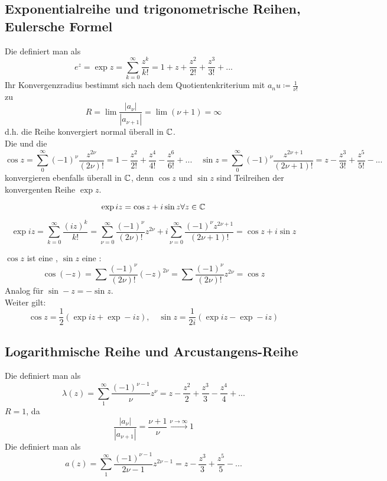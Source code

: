 \subsection*{Exponentialreihe und trigonometrische Reihen, Eulersche Formel} Die  definiert man als
\[ e^z=\exp z=\sum_{k=0}^{\infty}\frac{z^k}{k!}=1+z+\frac{z^2}{2!}+\frac{z^3}{3!}+... \]
Ihr Konvergenzradius bestimmt sich nach dem Quotientenkriterium mit $ a_nu\coloneqq\frac{1}{\nu!} $ zu
\[ R=\lim\frac{|a_\nu|}{|a_{\nu+1}|}=\lim (\nu+1)=\infty \]
d.h. die Reihe konvergiert normal \"uberall in $ \mathbb{C} $.\\
Die  und die 
\[ \cos z=\sum_{0}^{\infty}(-1)^\nu\frac{z^{2\nu}}{(2\nu)!}=1-\frac{z^2}{2!}+\frac{z^4}{4!}-\frac{z^6}{6!}+...\quad\sin z=\sum_0^\infty(-1)^\nu\frac{z^{2\nu+1}}{(2\nu+1)!}=z-\frac{z^3}{3!}+\frac{z^5}{5!}-... \]
konvergieren ebenfalls \"uberall in $ \mathbb{C} $, denn $ \cos z $ und $ \sin z $ sind Teilreihen der konvergenten Reihe $ \exp z $.\\
\begin{satz}
	\[ \exp iz=\cos z+i\sin z\forall z\in\mathbb{C} \]
\end{satz}
\begin{beweis}
	\[ \exp iz=\sum_{k=0}^{\infty}\frac{(iz)^k}{k!}=\sum_{\nu=0}^{\infty}\frac{(-1)^\nu}{(2\nu)!}z^{2\nu}+i\sum_{\nu=0}^{\infty}\frac{(-1)^\nu z^{2\nu+1}}{(2\nu+1)!}=\cos z+i\sin z \]
\end{beweis}
$ \cos z $ ist eine , $ \sin z $ eine :
\[ \cos(-z)=\sum\frac{(-1)^\nu}{(2\nu)!}(-z)^{2\nu}=\sum\frac{(-1)^\nu}{(2\nu)!}z^{2\nu}=\cos z \]
Analog f\"ur $ \sin -z=-\sin z $.\\
Weiter gilt:
\[ \cos z=\frac{1}{2}(\exp iz+\exp -iz),\quad \sin z=\frac{1}{2i}(\exp iz-\exp -iz) \] 
\subsection*{Logarithmische Reihe und Arcustangens-Reihe}
Die  definiert man als
\[ \lambda(z)=\sum_1^\infty\frac{(-1)^{\nu-1}}{\nu}z^\nu=z-\frac{z^2}{2}+\frac{z^3}{3}-\frac{z^4}{4}+... \]
$ R=1 $, da
\[ \frac{|a_\nu|}{|a_{\nu+1}|}=\frac{\nu+1}{\nu}\xrightarrow{\nu\to\infty}1 \]
Die  definiert man als
\[ a(z)=\sum_1^\infty\frac{(-1)^{\nu-1}}{2\nu-1}z^{2\nu-1}=z-\frac{z^3}{3}+\frac{z^5}{5}-... \]
